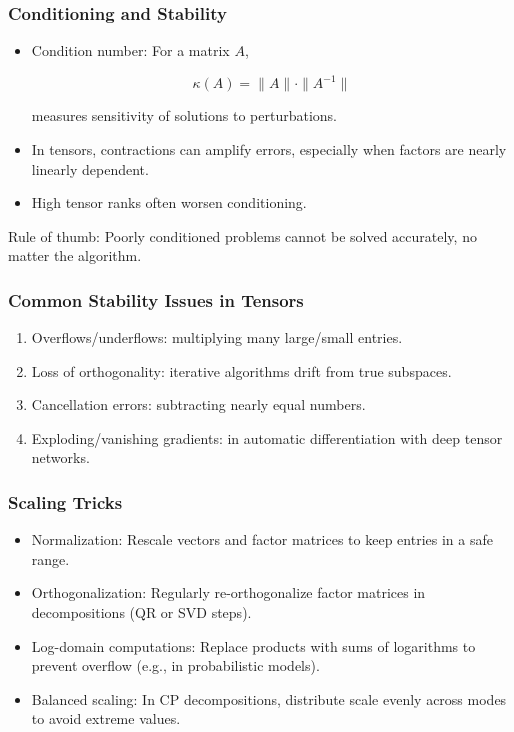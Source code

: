 \documentclass[
  letterpaper,
  DIV=11,
  numbers=noendperiod]{scrreprt}
\providecommand{\tightlist}{%
  \setlength{\itemsep}{0pt}\setlength{\parskip}{0pt}}
\begin{document}
\subsubsection{Conditioning and
Stability}\label{conditioning-and-stability}

\begin{itemize}
\item
  Condition number: For a matrix \(A\),

  \[
  \kappa(A) = \|A\| \cdot \|A^{-1}\|
  \]

  measures sensitivity of solutions to perturbations.
\item
  In tensors, contractions can amplify errors, especially when factors
  are nearly linearly dependent.
\item
  High tensor ranks often worsen conditioning.
\end{itemize}

Rule of thumb: Poorly conditioned problems cannot be solved accurately,
no matter the algorithm.

\subsubsection{Common Stability Issues in
Tensors}\label{common-stability-issues-in-tensors}

\begin{enumerate}
\def\labelenumi{\arabic{enumi}.}
\tightlist
\item
  Overflows/underflows: multiplying many large/small entries.
\item
  Loss of orthogonality: iterative algorithms drift from true subspaces.
\item
  Cancellation errors: subtracting nearly equal numbers.
\item
  Exploding/vanishing gradients: in automatic differentiation with deep
  tensor networks.
\end{enumerate}

\subsubsection{Scaling Tricks}\label{scaling-tricks}

\begin{itemize}
\tightlist
\item
  Normalization: Rescale vectors and factor matrices to keep entries in
  a safe range.
\item
  Orthogonalization: Regularly re-orthogonalize factor matrices in
  decompositions (QR or SVD steps).
\item
  Log-domain computations: Replace products with sums of logarithms to
  prevent overflow (e.g., in probabilistic models).
\item
  Balanced scaling: In CP decompositions, distribute scale evenly across
  modes to avoid extreme values.
\end{itemize}
\end{document}
